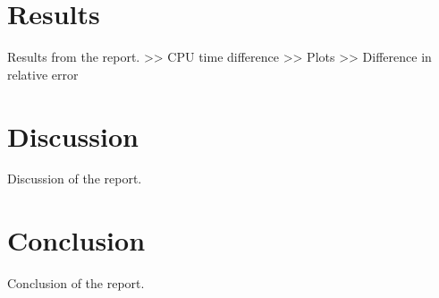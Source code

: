 \documentclass[10pt, a4paper]{amsart}
\begin{document}
\section{Results}
Results from the report.
>> CPU time difference >> Plots >> Difference in relative error

\section{Discussion}
Discussion of the report.
\section{Conclusion}
Conclusion of the report.



% 
\end{document}
